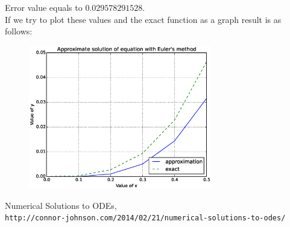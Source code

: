 \documentclass[a4paper,10pt]{article}
\begin{document}
Error value equals to $0.029578291528$.\\
If we try to plot these values and the exact function as a graph result is as follows:
\begin{figure}[ht]
\includegraphics[width=8cm]{1_1.eps}
\end{figure}

\medskip

\begin{thebibliography}{9}
 Numerical Solutions to ODEs, \\\texttt{http://connor-johnson.com/2014/02/21/numerical-solutions-to-odes/}
\end{thebibliography}
\end{document}
